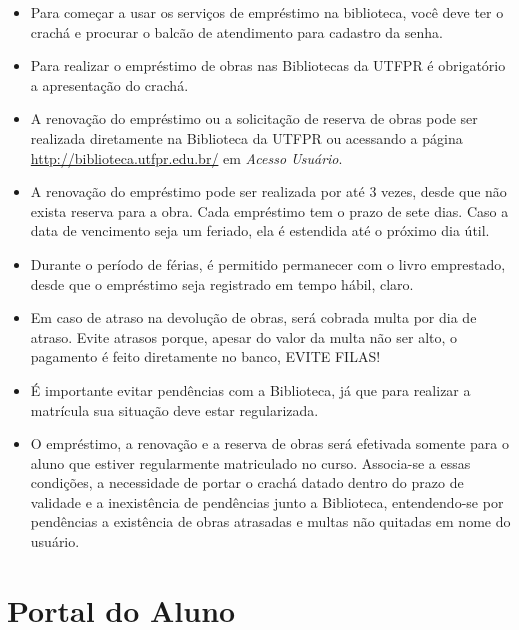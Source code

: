 \documentclass[a4paper,12pt,openany]{article}
\begin{document}
\begin{itemize}

\item Para começar a usar os serviços de empréstimo na biblioteca, você deve ter o crachá e procurar o balcão de atendimento para cadastro da senha.

\item Para realizar o empréstimo de obras nas Bibliotecas da UTFPR é obrigatório a apresentação do crachá.

\item A renovação do empréstimo ou a solicitação de reserva de obras pode ser realizada diretamente na Biblioteca da UTFPR ou acessando a página \url{http://biblioteca.utfpr.edu.br/} em \textit{Acesso Usuário}.  

\item A renovação do empréstimo pode ser realizada por até 3 vezes, desde que não exista reserva para a obra. Cada empréstimo tem o prazo de sete dias. Caso a data de vencimento seja um feriado, ela é estendida até o próximo dia útil.

\item Durante o período de férias, é permitido permanecer com o livro emprestado, desde que o empréstimo seja registrado em tempo hábil, claro.

\item Em caso de atraso na devolução de obras, será cobrada multa por dia de atraso. Evite atrasos porque, apesar do valor da multa não ser alto, o pagamento é feito diretamente no banco, EVITE FILAS!

\item É importante evitar pendências com a Biblioteca, já que para realizar a matrícula sua situação deve estar regularizada.

\item O empréstimo, a renovação e a reserva de obras será efetivada somente para o aluno que estiver regularmente matriculado no curso. Associa-se a essas  condições, a necessidade de portar o crachá datado dentro do prazo de validade e a inexistência de pendências junto a Biblioteca, entendendo-se por pendências a  existência de obras atrasadas e multas não quitadas em nome do usuário. 

\end{itemize}


\newpage
\section{Portal do Aluno}
\end{document}
